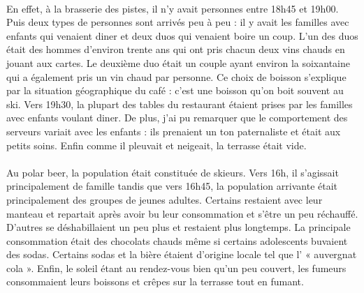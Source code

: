 \paragraph{}
En effet, à la brasserie des pistes, il n’y avait personnes entre 18h45 et
19h00. Puis deux types de personnes sont arrivés peu à peu : il y avait les
familles avec enfants qui venaient diner et deux duos qui venaient boire un
coup. L’un des duos était des hommes d’environ trente ans qui ont pris chacun
deux vins chauds en jouant aux cartes. Le deuxième duo était un couple ayant
environ la soixantaine qui a également pris un vin chaud par personne. Ce choix
de boisson s’explique par la situation géographique du café : c’est une boisson
qu’on boit souvent au ski. Vers 19h30, la plupart des tables du restaurant
étaient prises par les familles avec enfants voulant diner. De plus, j’ai pu
remarquer que le comportement des serveurs variait avec les enfants : ils
prenaient un ton paternaliste et était aux petits soins. Enfin comme il
pleuvait et neigeait, la terrasse était vide.

\paragraph{}
Au polar beer, la population était constituée de skieurs. Vers 16h, il
s’agissait principalement de famille tandis que vers 16h45, la population
arrivante était principalement des groupes de jeunes adultes. Certains
restaient avec leur manteau et repartait après avoir bu leur consommation et
s’être un peu réchauffé. D’autres se déshabillaient un peu plus et restaient
plus longtemps. La principale consommation était des chocolats chauds même si
certains adolescents buvaient des sodas.  Certains sodas et la bière étaient
d’origine locale tel que l’ « auvergnat cola ». Enfin, le soleil étant au
rendez-vous bien qu’un peu couvert, les fumeurs consommaient leurs boissons et
crêpes sur la terrasse tout en fumant.

